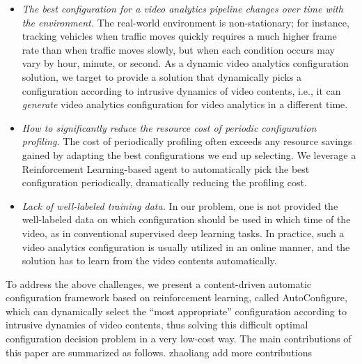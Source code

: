 \begin{itemize}	
\item \emph{The best configuration for a video analytics pipeline changes over time with the environment.} The real-world environment is non-stationary; for instance, tracking vehicles when traffic moves quickly requires a much higher frame rate than when traffic moves slowly, but when each condition occurs may vary by hour, minute, or second. As a dynamic video analytics configuration solution, we target to provide a solution that dynamically picks a configuration according to intrusive dynamics of video contents, i.e., it can \emph{generate} video analytics configuration for video analytics in a different time.

\item \emph{How to significantly reduce the resource cost of periodic configuration profiling.} The cost of periodically profiling often exceeds any resource savings gained by adapting the best configurations we end up selecting. We leverage a Reinforcement Learning-based agent to automatically pick the best configuration periodically, dramatically reducing the profiling cost. 

\item \emph{Lack of well-labeled training data.} In our problem, one is not provided the well-labeled data on which configuration should be used in which time of the video, as in conventional supervised deep learning tasks. In practice, such a video analytics configuration is usually utilized in an online manner, and the solution has to learn from the video contents automatically. 
\end{itemize}

To address the above challenges, we present a content-driven automatic configuration framework based on reinforcement learning, called AutoConfigure, which can dynamically select the ``most appropriate'' configuration according to intrusive dynamics of video contents, thus solving this difficult optimal configuration decision problem in a very low-cost way. The main contributions of this paper are summarized as follows.
\textcolor{note}{zhaoliang add more contributions}

